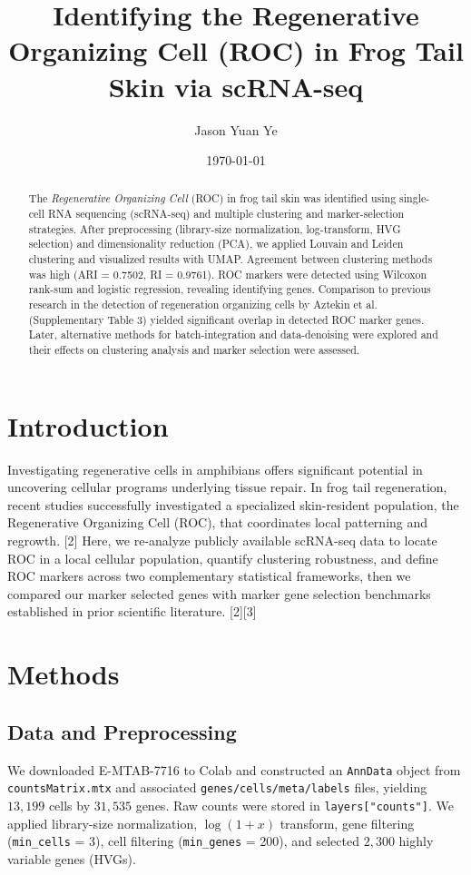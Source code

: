 \documentclass[11pt]{article}
\title{Identifying the Regenerative Organizing Cell (ROC) in Frog Tail Skin via scRNA-seq}
\author{Jason Yuan Ye}
\date{\today}
\begin{document}
\maketitle

\begin{abstract}
The \emph{Regenerative Organizing Cell} (ROC) in frog tail skin was identified using single-cell RNA sequencing (scRNA-seq) and multiple clustering and marker-selection strategies. After preprocessing (library-size normalization, log-transform, HVG selection) and dimensionality reduction (PCA), we applied Louvain and Leiden clustering and visualized results with UMAP. Agreement between clustering methods was high (ARI = 0.7502, RI = 0.9761). ROC markers were detected using Wilcoxon rank-sum and logistic regression, revealing identifying genes. Comparison to previous research in the detection of regeneration organizing cells by Aztekin et al. (Supplementary Table 3) yielded significant overlap in detected ROC marker genes. Later, alternative methods for batch-integration and data-denoising were explored and their effects on clustering analysis and marker selection were assessed. 
\end{abstract}

\section{Introduction}
Investigating regenerative cells in amphibians offers significant potential in uncovering  cellular programs underlying tissue repair. In frog tail regeneration, recent studies successfully investigated a specialized skin-resident population, the Regenerative Organizing Cell (ROC), that coordinates local patterning and regrowth. [2] Here, we re-analyze publicly available scRNA-seq data to locate ROC in a local cellular population, quantify clustering robustness, and define ROC markers across two complementary statistical frameworks, then we compared our marker selected genes with marker gene selection benchmarks established in prior scientific literature. [2][3]

\section{Methods}
\subsection{Data and Preprocessing}
We downloaded E-MTAB-7716 to Colab and constructed an \texttt{AnnData} object from \texttt{countsMatrix.mtx} and associated \texttt{genes/cells/meta/labels} files, yielding \(13{,}199\) cells by \(31{,}535\) genes. Raw counts were stored in \texttt{layers["counts"]}. We applied library-size normalization, \(\log(1+x)\) transform, gene filtering (\texttt{min\_cells} = 3), cell filtering (\texttt{min\_genes} = 200), and selected \(2{,}300\) highly variable genes (HVGs).
\end{document}
